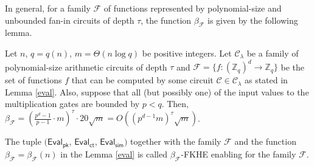 \documentclass[runningheads,10pt]{llncs}
\begin{document}
 
In general, for a family $\mathcal{F}$ of functions 
represented by polynomial-size and unbounded fan-in circuits of depth $\tau$, the function $\beta_{\mathcal{F}}$ is given by the following lemma.
\begin{lemma}\label{eval2} Let $n$, $q=q(n)$, 
$m=\Theta(n\log q)$ be positive integers. 
Let $\mathcal{C}_{\lambda}$ be a family of polynomial-size arithmetic circuits of depth $\tau$ 
and $\mathcal{F}=\{f:(\mathbb{Z}_q)^d \rightarrow \mathbb{Z}_q\}$ be the set of functions $f$ that can be computed by some circuit $\mathcal{C} \in \mathcal{C}_{\lambda}$ as stated in Lemma \ref{eval}. Also, suppose that all (but possibly one)  of the input values to the multiplication gates are bounded by $p<q$. Then, 	  $\beta_{\mathcal{F}}=(\frac{p^d-1}{p-1}\cdot m)^\tau \cdot 20\sqrt{m}=O((p^{d-1}m)^\tau\sqrt{m})$.
\end{lemma}
 
\begin{definition} The tuple
$(\mathsf{Eval}_\mathsf{pk}$,   $\mathsf{Eval}_\mathsf{ct}$,  
	$ \mathsf{Eval}_\mathsf{sim})$ together with the family $\mathcal{F}$ and the function $\beta_{\mathcal{F}}=\beta_{\mathcal{F}}(n)$ in the Lemma \ref{eval}  is called $\beta_{\mathcal{F}}$-FKHE enabling for the family $\mathcal{F}$.
\end{definition}	
\end{document}
